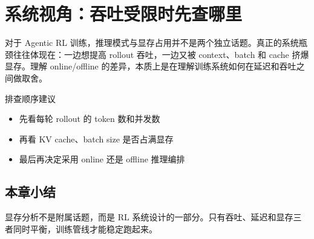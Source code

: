 \section{系统视角：吞吐受限时先查哪里}
对于 Agentic RL 训练，推理模式与显存占用并不是两个独立话题。真正的系统瓶颈往往体现在：一边想提高 rollout 吞吐，一边又被 context、batch 和 cache 挤爆显存。理解 online/offline 的差异，本质上是在理解训练系统如何在延迟和吞吐之间做取舍。

\begin{knowledgebox}{排查顺序建议}
\begin{itemize}
  \item 先看每轮 rollout 的 token 数和并发数
  \item 再看 KV cache、batch size 是否占满显存
  \item 最后再决定采用 online 还是 offline 推理编排
\end{itemize}
\end{knowledgebox}

\subsection{本章小结}
显存分析不是附属话题，而是 RL 系统设计的一部分。只有吞吐、延迟和显存三者同时平衡，训练管线才能稳定跑起来。

\newpage
